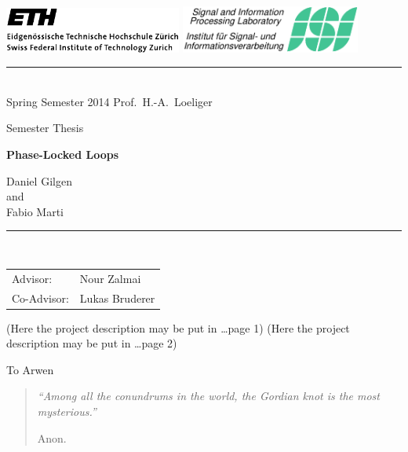 \documentclass[11pt,a4paper,twoside]{report}
\begin{document}
\pagestyle{plain}

\begin{titlepage}
  \begin{center}
    \includegraphics[height=15mm]{gfx/ethlogo} \hfill
    \includegraphics[height=15.5mm]{gfx/isilogo_left}
    \rule{\textwidth}{0.5pt}\\[1ex]
    {\Large Spring Semester 2014 \hfill 
      Prof.~H.-A.~Loeliger
    }

    \LARGE Semester Thesis

    \Huge\textbf{
      Phase-Locked Loops
    }
    
    \LARGE{
      Daniel Gilgen\\
      and \\
      Fabio Marti \\
    }
    
  \end{center}
  \rule{\textwidth}{0.5pt}\\[2ex]
  \noindent
  \begin{tabular}{@{}ll@{}}
    \Large Advisor: & \Large Nour Zalmai\\[1ex]
    \Large Co-Advisor: & \Large Lukas Bruderer
  \end{tabular}
\end{titlepage}

\cleardoublepage
(Here the project description may be put in \ldots page 1)
\clearpage
(Here the project description may be put in \ldots page 2)
\cleardoublepage

\thispagestyle{empty}
\bigskip
\begin{center}   
  To Arwen
\end{center}

\vfill
\begin{quote}
  \itshape
  ``Among all the conundrums in the world, the Gordian knot is the most
  mysterious.''

  \hfill Anon.
\end{quote}
\vfill
\end{document}
